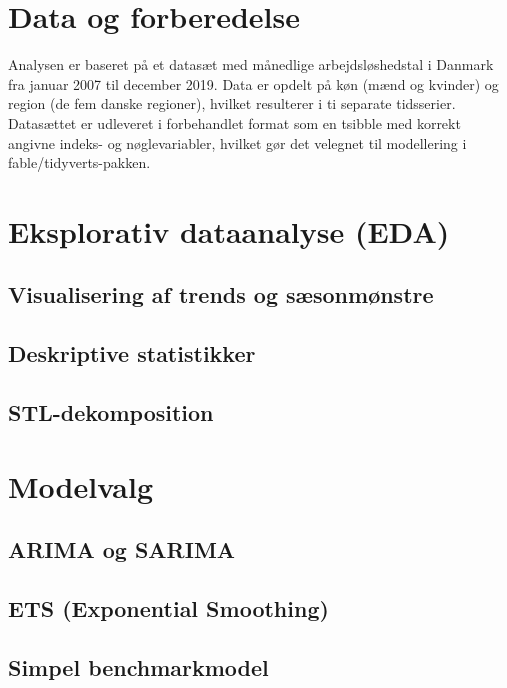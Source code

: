 \documentclass[
]{article}
\begin{document}
\section{Data og forberedelse}\label{data-og-forberedelse}

Analysen er baseret på et datasæt med månedlige arbejdsløshedstal i
Danmark fra januar 2007 til december 2019. Data er opdelt på køn (mænd
og kvinder) og region (de fem danske regioner), hvilket resulterer i ti
separate tidsserier. Datasættet er udleveret i forbehandlet format som
en tsibble med korrekt angivne indeks- og nøglevariabler, hvilket gør
det velegnet til modellering i fable/tidyverts-pakken.

\section{Eksplorativ dataanalyse
(EDA)}\label{eksplorativ-dataanalyse-eda}

\subsection{Visualisering af trends og
sæsonmønstre}\label{visualisering-af-trends-og-suxe6sonmuxf8nstre}

\subsection{Deskriptive statistikker}\label{deskriptive-statistikker}

\subsection{STL-dekomposition}\label{stl-dekomposition}

\section{Modelvalg}\label{modelvalg}

\subsection{ARIMA og SARIMA}\label{arima-og-sarima}

\subsection{ETS (Exponential
Smoothing)}\label{ets-exponential-smoothing}

\subsection{Simpel benchmarkmodel}\label{simpel-benchmarkmodel}
\end{document}
